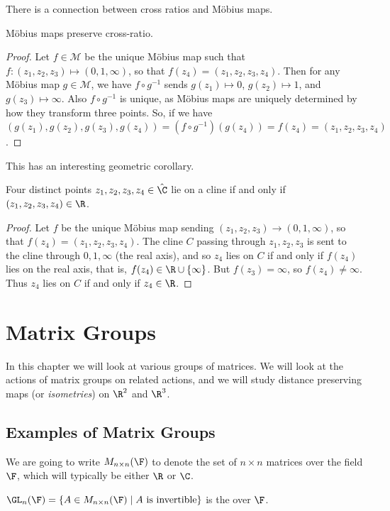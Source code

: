 \documentclass[a4paper]{scrartcl}
\newcommand{\newchapter}{\section}
\newcommand{\newsection}{\subsection}
\begin{document}
There is a connection between cross ratios and Möbius maps.

\begin{theorem}
	Möbius maps preserve cross-ratio.
\end{theorem}
\begin{proof}
	Let $f \in \mathcal{M}$ be the unique Möbius map such that $f:(z_1, z_2, z_3) \mapsto (0, 1, \infty)$, so that $f(z_4) = (z_1, z_2, z_3, z_4)$. Then for any Möbius map $g \in \mathcal{M}$, we have $f \circ g^{-1}$ sends $g(z_1) \mapsto 0$, $g(z_2) \mapsto 1$, and $g(z_3) \mapsto \infty$. Also $f \circ g^{-1}$ is unique, as Möbius maps are uniquely determined by how they transform three points. So, if we have $(g(z_1), g(z_2), g(z_3), g(z_4)) = (f \circ g^{-1})(g(z_4)) = f(z_4) = (z_1, z_2, z_3, z_4)$.
\end{proof}

This has an interesting geometric corollary.

\begin{theorem}
	Four distinct points $z_1, z_2, z_3, z_4 \in \hat{\C}$ lie on a cline if and only if
	$(z_1, z_2, z_3, z_4) \in \R$.
\end{theorem}
\begin{proof}
	Let $f$ be the unique Möbius map sending $(z_1, z_2, z_3) \rightarrow (0, 1, \infty)$, so that $f(z_4) = (z_1, z_2, z_3, z_4)$. The cline $C$ passing through $z_1, z_2, z_3$ is sent to the cline through $0, 1, \infty$ (the real axis), and so $z_4$ lies on $C$ if and only if $f(z_4)$ lies on the real axis, that is, $f(z_4) \in \R \cup \{\infty\}$. But $f(z_3) = \infty$, so $f(z_4) \neq \infty$. Thus $z_4$ lies on $C$ if and only if $z_4 \in \R$. 
\end{proof}

\newchapter{Matrix Groups}

In this chapter we will look at various groups of matrices. We will look at the actions of matrix groups on related actions, and we will study distance preserving maps (or \emph{isometries}) on $\R^2$ and $\R^3$.

\newsection{Examples of Matrix Groups}

We are going to write $M_{n \times n}(\F)$ to denote the set of $n \times n$ matrices over the field $\F$, which will typically be either $\R$ or $\C$.

\begin{definition}
	$\GL_n(\F) = \{A \in M_{n \times n}(\F) \mid A \text{ is invertible}\}$
 is the  over $\F$.
\end{definition}
\end{document}
